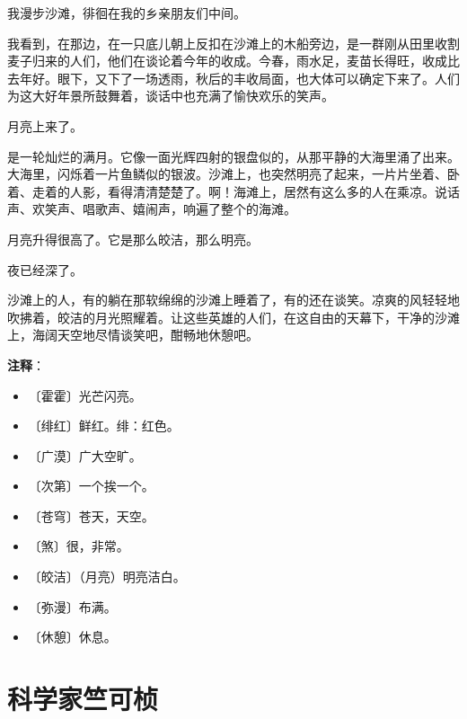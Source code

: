\documentclass[12pt,UTF-8,openany]{ctexbook}
\begin{document}
\begin{large}
    我漫步沙滩，徘徊在我的乡亲朋友们中间。
    
    我看到，在那边，在一只底儿朝上反扣在沙滩上的木船旁边，是一群刚从田里收割麦子归来的人们，他们在谈论着今年的收成。今春，雨水足，麦苗长得旺，收成比去年好。眼下，又下了一场透雨，秋后的丰收局面，也大体可以确定下来了。人们为这大好年景所鼓舞着，谈话中也充满了愉快欢乐的笑声。
    
    月亮上来了。
    
    是一轮灿烂的满月。它像一面光辉四射的银盘似的，从那平静的大海里涌了出来。大海里，闪烁着一片鱼鳞似的银波。沙滩上，也突然明亮了起来，一片片坐着、卧着、走着的人影，看得清清楚楚了。啊！海滩上，居然有这么多的人在乘凉。说话声、欢笑声、唱歌声、嬉闹声，响遍了整个的海滩。
    
    月亮升得很高了。它是那么皎洁，那么明亮。
    
    夜已经深了。
    
    沙滩上的人，有的躺在那软绵绵的沙滩上睡着了，有的还在谈笑。凉爽的风轻轻地吹拂着，皎洁的月光照耀着。让这些英雄的人们，在这自由的天幕下，干净的沙滩上，海阔天空地尽情谈笑吧，酣畅地休憩吧。
    
\end{large}


\newpage

\textbf{注释}：

\vspace{-1em}

\begin{itemize}
    \setlength\itemsep{-0.2em}
    \item 〔霍霍〕光芒闪亮。
    \item 〔绯红〕鲜红。绯：红色。
    \item 〔广漠〕广大空旷。
    \item 〔次第〕一个挨一个。
    \item 〔苍穹〕苍天，天空。
    \item 〔煞〕很，非常。
    \item 〔皎洁〕（月亮）明亮洁白。
    \item 〔弥漫〕布满。
    \item 〔休憩〕休息。
\end{itemize}

\chapter{科学家竺可桢}
\end{document}
